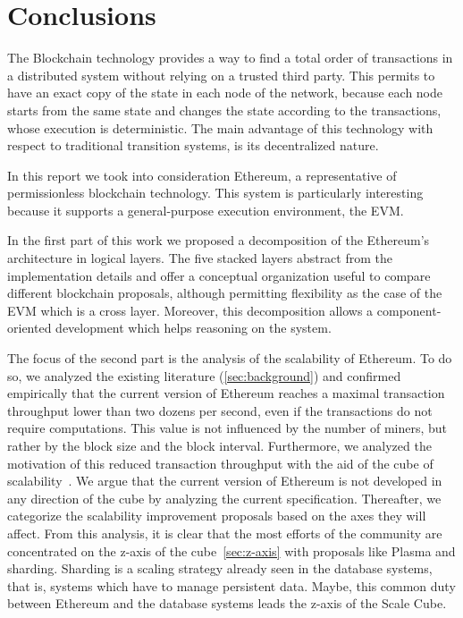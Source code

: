 \section{Conclusions}
\label{sec:conclusions}
The Blockchain technology provides a way to find a total order of transactions
in a distributed system without relying on a trusted third party. This permits
to have an exact copy of the state in each node of the network, because each
node starts from the same state and changes the state according to the
transactions, whose execution is deterministic. The main advantage of this
technology with respect to traditional transition systems, is its decentralized
nature.

In this report we took into consideration Ethereum, a representative of
permissionless blockchain technology. This system is particularly interesting
because it supports a general-purpose execution environment, the EVM.

In the first part of this work we proposed a decomposition of the Ethereum's
architecture in logical layers. The five stacked layers abstract from the
implementation details and offer a conceptual organization useful to compare
different blockchain proposals, although permitting flexibility as the case of
the EVM which is a cross layer. Moreover, this decomposition allows a
component-oriented development which helps reasoning on the system.

The focus of the second part is the analysis of the scalability of Ethereum. To
do so, we analyzed the existing literature (\autoref{sec:background}) and
confirmed empirically that the current version of Ethereum reaches a maximal
transaction throughput lower than two dozens per second, even if the
transactions do not require computations. This value is not influenced by the
number of miners, but rather by the block size and the block interval.
Furthermore, we analyzed the motivation of this reduced transaction throughput
with the aid of the cube of scalability~\cite{bib:art-of-scalability}. We argue
that the current version of Ethereum is not developed in any direction of the
cube by analyzing the current specification. Thereafter, we categorize the
scalability improvement proposals based on the axes they will affect. From this
analysis, it is clear that the most efforts of the community are concentrated on
the z-axis of the cube~\autoref{sec:z-axis} with proposals like Plasma and
sharding. Sharding is a scaling strategy already seen in the database systems,
that is, systems which have to manage persistent data. Maybe, this common duty
between Ethereum and the database systems leads the z-axis of the Scale Cube.
